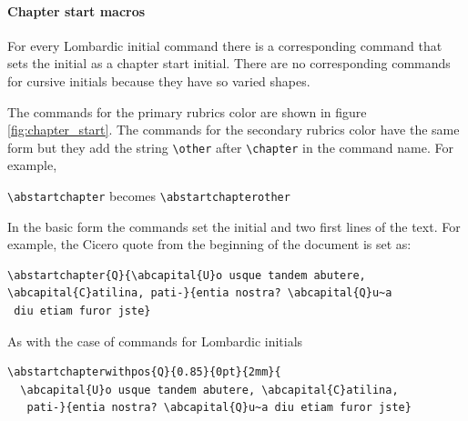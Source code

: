 \documentclass[a4paper]{article}
\newcommand{\ltxncmd}[1]{\texttt{\textbackslash{}#1}}
\begin{document}
\paragraph{Chapter start macros}

For every Lombardic initial command there is a corresponding command
that sets the initial as a chapter start initial. There are no
corresponding commands for cursive initials because they have so
varied shapes.

The commands for the primary rubrics color are shown in figure
\ref{fig:chapter_start}. The commands for the secondary rubrics color
have the same form but they add the string \ltxncmd{other} after
\ltxncmd{chapter} in the command name. For example, 
\begin{center}
  \ltxncmd{abstartchapter} becomes \ltxncmd{abstartchapterother}
\end{center}

In the basic form the commands set the initial and two first lines of
the text. For example, the Cicero quote from the beginning of the
document is set as:

\begin{center}
  \begin{minipage}{10.5cm}
    {{\fontsize{16}{19}\selectfont
        }}
\end{minipage}
\mbox{}\kern-1cm\begin{minipage}{10.5cm}
\begin{verbatim}
\abstartchapter{Q}{\abcapital{U}o usque tandem abutere, 
\abcapital{C}atilina, pati-}{entia nostra? \abcapital{Q}u~a
 diu etiam furor jste}
\end{verbatim}
  \end{minipage}
\end{center}

As with the case of commands for Lombardic initials


\begin{center}
  \begin{minipage}{10.5cm}
    {{\fontsize{16}{19}\selectfont
        }}
\end{minipage}
\mbox{}\kern-1cm\begin{minipage}{10.5cm}
\begin{verbatim}
\abstartchapterwithpos{Q}{0.85}{0pt}{2mm}{
  \abcapital{U}o usque tandem abutere, \abcapital{C}atilina,
   pati-}{entia nostra? \abcapital{Q}u~a diu etiam furor jste}
\end{verbatim}
  \end{minipage}
\end{center}
\end{document}
